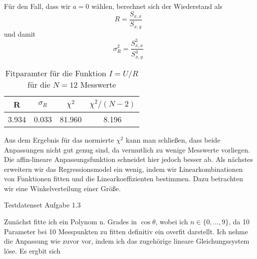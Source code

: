\documentclass[12pt]{article}
\begin{document}
Für den Fall, dass wir $a=0$ wählen, berechnet sich der Wiederstand als
$$R=\frac{S_{x,x}}{S_{x,y}}$$
und damit
$$\sigma_R^2=\frac{S_{x,x}^3}{S_{x,y}^4}$$
\begin{table}[H]\centering\begin{tabular}{c|c|c|c}R&$\sigma_R$&$\chi^2$&$\chi^2/(N-2)$\\\hline
    3.934&0.033&81.960&8.196
\end{tabular}\caption{Fitparamter für die Funktion $I=U/R$ für die $N=12$ Messwerte}\end{table}
Aus dem Ergebnis für das normierte $\chi^2$ kann man schließen, dass beide Anpassungen nicht gut genug sind, da vermutlich zu wenige Messwerte vorliegen. Die affin-lineare Anpassungsfunktion schneidet hier jedoch besser ab.\newline\newline{
}\newpage
Als nächstes erweitern wir das Regressionsmodel ein wenig, indem wir Linearkombinationen von Funktionen fitten und die Linearkoeffizienten bestimmen. Dazu betrachten wir eine Winkelverteilung einer Größe.
\begin{table}[H]\centering
    \caption{Testdatenset Aufgabe 1.3}
    \end{table} 
Zunächst fitte ich ein Polynom n. Grades in $\cos\theta$, wobei ich $n\in\{0,\dots,9\}$, da 10 Parameter bei 10 Messpunkten zu fitten definitiv ein overfit darstellt. Ich nehme die Anpassung wie zuvor vor, indem ich das zugehörige lineare Gleichungssystem löse. Es ergbit sich
\end{document}
